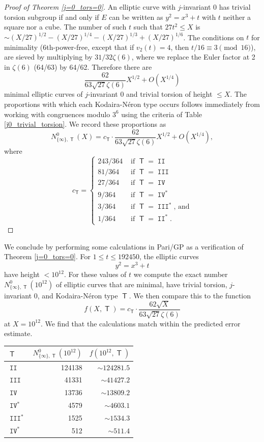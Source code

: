 \documentclass{amsart}
\newcommand{\T}{\operatorname{\mathsf{T}}}
\DeclareMathOperator{\II}{\mathtt{II}}
\DeclareMathOperator{\III}{\mathtt{III}}
\DeclareMathOperator{\IV}{\mathtt{IV}}
\numberwithin{equation}{section}
\theoremstyle{plain}
\theoremstyle{remark}
\begin{document}
\begin{proof}[Proof of Theorem \ref{j=0_tors=0}]
An elliptic curve with $j$-invariant 0 has trivial torsion subgroup if and only if $E$ can be written as $y^2 = x^3 + t$ with $t$ neither a square nor a cube.  The number of such $t$ such that $27t^2 \leq X$ is $\sim (X/27)^{1/2} - (X/27)^{1/4} - (X/27)^{1/3} + (X/27)^{1/6}$.  The conditions on $t$ for minimality (6th-power-free, except that if $v_2(t) = 4$, then $t/16 \equiv 3 \pmod{16}$), are sieved by multiplying by $31/32\zeta(6)$, where we replace the Euler factor at 2 in $\zeta(6)$ (64/63) by 64/62.  Therefore there are 
\[
\frac{62}{63 \sqrt{27}\zeta(6)} X^{1/2} + O(X^{1/4}) 
\]
minimal elliptic curves of $j$-invariant 0 and trivial torsion of height $\leq X$.  The proportions with which each Kodaira-N\'eron type occurs follows immediately from working with congruences modulo $3^6$ using the criteria of Table \ref{j0_trivial_torsion}.  We record these proportions as
\[
N_{\lbrace \infty \rbrace ,\T}^0(X) = c_{\T} \cdot \frac{62}{63\sqrt{27}\zeta(6)} X^{1/2} + O(X^{1/4}),
\]
where 
\[
c_{\T} = 
\begin{cases} 
243/364 & \text{ if $\T = \II$} \\
81/364& \text{ if $\T = \III$} \\
27/364& \text{ if $\T = \IV$} \\
9/364& \text{ if $\T = \IV^*$} \\
3/364& \text{ if $\T = \III^*$, and} \\
1/364& \text{ if $\T = \II^*$}.
\end{cases}
\]
\end{proof}

We conclude by performing some calculations in Pari/GP as a verification of Theorem \ref{j=0_tors=0}.  For $1 \leq t \leq 192450$, the elliptic curves 
\[
y^2 = x^3 + t
\]
have height $<10^{12}$.   For these values of $t$ we compute the exact number $N_{\lbrace \infty \rbrace,\T}^0(10^{12})$ of elliptic curves that are minimal, have trivial torsion, $j$-invariant 0, and Kodaira-N\'eron type $\T$.  We then compare this to the function
\[
f(X,\T) = c_{\T} \cdot \frac{62\sqrt{X}}{63\sqrt{27}\zeta(6)}
\]
at $X = 10^{12}$.   We find that the calculations match within the predicted error estimate.

\begin{center}
\begin{tabular}{|l|r|r|}
\hline
$\T$ & $N_{\lbrace \infty \rbrace,\T}^0(10^{12})$ & $f(10^{12},\T)$ \\
\hline
$\II$  & 124138 & $\sim 124281.5$ \\
$\III$ & 41331& $\sim 41427.2$ \\
$\IV$ & 13736 & $\sim 13809.2$  \\
$\IV^*$ & 4579& $\sim 4603.1$  \\
$\III^*$ &  1525& $\sim 1534.3$ \\
$\IV^*$ &512 & $\sim 511.4$ \\
\hline
\end{tabular}
\end{center}
\end{document}
